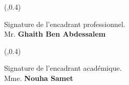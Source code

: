 \thispagestyle{empty}
\framebox(\textwidth,0.4\textheight){\begin{minipage}{\textwidth}
        \centering Signature de l'encadrant professionnel.\\Mr. \textbf{Ghaith Ben Abdessalem}
    \end{minipage}}
\mbox{}
\vfill
\framebox(\textwidth,0.4\textheight){\begin{minipage}{\textwidth}
        \centering Signature de l'encadrant académique.\\
        Mme. \textbf{Nouha Samet}
    \end{minipage}}